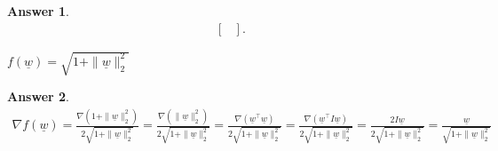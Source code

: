 \documentclass{article}
\theoremstyle{definition}
\newtheorem*{answer}{Answer}
\begin{document}
\begin{question}
\begin{question}
\begin{answer}
\begin{align*}
\begin{bmatrix}
				\end{bmatrix}.
			\end{align*}
		\end{answer}
		\item $f(\underline{w}) = \sqrt{1 + \|\underline{w}\|_2^2}$
		\begin{answer}
			\begin{align*}
				\nabla f(\underline{w}) = \frac{\nabla (1 + \|\underline{w}\|_2^2)}{2\sqrt{1 + \|\underline{w}\|_2^2}} = \frac{\nabla (\|\underline{w}\|_2^2)}{2\sqrt{1 + \|\underline{w}\|_2^2}} = \frac{\nabla (\underline{w}^\top \underline{w})}{2\sqrt{1 + \|\underline{w}\|_2^2}} = \frac{\nabla (\underline{w}^\top I \underline{w})}{2\sqrt{1 + \|\underline{w}\|_2^2}} = \frac{2I\underline{w}}{2\sqrt{1 + \|\underline{w}\|_2^2}} = \frac{\underline{w}}{\sqrt{1 + \|\underline{w}\|_2^2}}
			\end{align*}
		\end{answer}
	\end{question}
	

\end{question}
\end{document}
